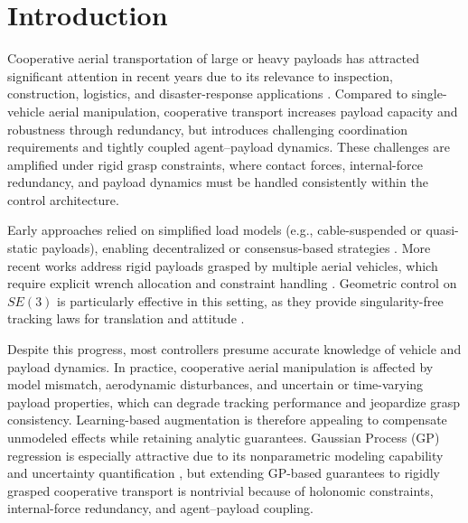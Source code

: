 \documentclass[letterpaper, 10 pt, conference]{ieeeconf}  %
\newcommand{\0}{\matr{0}}
\begin{document}

\section{Introduction} 
\label{sec:Intro}

Cooperative aerial transportation of large or heavy payloads has attracted
significant attention in recent years due to its relevance to inspection,
construction, logistics, and disaster-response applications
\cite{mellinger2011minimum, ryll2016modeling}.
Compared to single-vehicle aerial manipulation, cooperative transport increases
payload capacity and robustness through redundancy, but introduces challenging
coordination requirements and tightly coupled agent--payload dynamics.
These challenges are amplified under rigid grasp constraints, where contact
forces, internal-force redundancy, and payload dynamics must be handled
consistently within the control architecture.

Early approaches relied on simplified load models (e.g., cable-suspended or
quasi-static payloads), enabling decentralized or consensus-based strategies
\cite{goodman2023geometric, michael2011cooperative}.
More recent works address rigid payloads grasped by multiple aerial vehicles,
which require explicit wrench allocation and constraint handling
\cite{ollero2021past, wang2018cooperative}.
Geometric control on $SE(3)$ is particularly effective in this setting,
as they provide singularity-free tracking laws for translation and attitude
\cite{lee2010geometric, sreenath2013geometric}.

Despite this progress, most controllers presume accurate knowledge of vehicle
and payload dynamics.
In practice, cooperative aerial manipulation is affected by model mismatch,
aerodynamic disturbances, and uncertain or time-varying payload properties,
which can degrade tracking performance and jeopardize grasp consistency.
Learning-based augmentation is therefore appealing to compensate unmodeled
effects while retaining analytic guarantees.
Gaussian Process (GP) regression is especially attractive due to its
nonparametric modeling capability and uncertainty quantification
\cite{rasmussen2006gaussian, berkenkamp2017safe, beckers2021onlinem, beckers2021online},
but extending GP-based guarantees to rigidly grasped cooperative transport is
nontrivial because of holonomic constraints, internal-force redundancy, and
agent--payload coupling.
\end{document}
